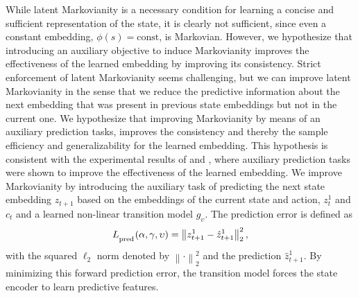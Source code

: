 \documentclass[a4paper,12pt]{article}
\newcommand{\norm}[1]{\left\lVert#1\right\rVert}
\begin{document}
While latent Markovianity is a necessary condition for learning a concise and sufficient representation of the state, it is clearly not sufficient, since even a constant embedding, $\phi(s)=\text{const}$, is Markovian. However, we hypothesize that introducing an auxiliary objective to induce Markovianity improves the effectiveness of the learned embedding by improving its consistency. Strict enforcement of latent Markovianity seems challenging, but we can improve latent Markovianity in the sense that we reduce the predictive information about the next embedding that was present in previous state embeddings but not in the current one. We hypothesize that improving Markovianity by means of an auxiliary prediction tasks, improves the consistency and thereby the sample efficiency and generalizability for the learned embedding. This hypothesis is consistent with the experimental results of \citet{lee2020predictive} and \citet{anand2019unsupervised}, where auxiliary prediction tasks were shown to improve the effectiveness of the learned embedding.
We improve Markovianity by introducing the auxiliary task of predicting the next state embedding $z_{t+1}$ based on the embeddings of the current state and action, $z_t^1$ and $c_t$ and a learned non-linear transition model $g_\upsilon$. The prediction error is defined as
\begin{equation}
    L_{\textsubscript{pred}}(\alpha, \gamma, \upsilon) = \norm{z_{t+1}^1 - \hat{z}_{t+1}^1}_2^2,
\label{eq:pred}
\end{equation}
with the squared $\ell_2$ norm denoted by $\norm{\cdot}_2^2$ and the prediction $\hat{z}_{t+1}^1$. By minimizing this forward prediction error, the transition model forces the state encoder to learn predictive features.
\end{document}

